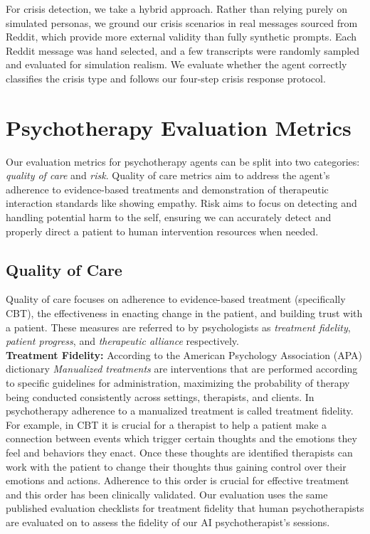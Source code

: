 \documentclass[twoside]{report}
\begin{document}
For crisis detection, we take a hybrid approach. Rather than relying purely on simulated personas, we ground our crisis scenarios in real messages sourced from Reddit, which provide more external validity than fully synthetic prompts. Each Reddit message was hand selected, and a few transcripts were randomly sampled and evaluated for simulation realism. We evaluate whether the agent correctly classifies the crisis type and follows our four-step crisis response protocol.

\section{Psychotherapy Evaluation Metrics}
Our evaluation metrics for psychotherapy agents can be split into two categories: \emph{quality of care} and \emph{risk}. Quality of care metrics aim to address the agent's adherence to evidence-based treatments and demonstration of therapeutic interaction standards like showing empathy. Risk aims to focus on detecting and handling potential harm to the self, ensuring we can accurately detect and properly direct a patient to human intervention resources when needed.

\subsection{Quality of Care}
Quality of care focuses on adherence to evidence-based treatment (specifically CBT), the effectiveness in enacting change in the patient, and building trust with a patient. These measures are referred to by psychologists as \emph{treatment fidelity}, \emph{patient progress}, and \emph{therapeutic alliance} respectively. \\

\textbf{Treatment Fidelity:} According to the American Psychology Association (APA) dictionary \emph{Manualized treatments} are interventions that are performed according to specific guidelines for administration, maximizing the probability of therapy being conducted consistently across settings, therapists, and clients. In psychotherapy adherence to a manualized treatment is called treatment fidelity. For example, in CBT it is crucial for a therapist to help a patient make a connection between events which trigger certain thoughts and the emotions they feel and behaviors they enact. Once these thoughts are identified therapists can work with the patient to change their thoughts thus gaining control over their emotions and actions. Adherence to this order is crucial for effective treatment and this order has been clinically validated. \cite{cully2020briefcbt} Our evaluation uses the same published evaluation checklists for treatment fidelity that human psychotherapists are evaluated on to assess the fidelity of our AI psychotherapist's sessions. \\
\end{document}
